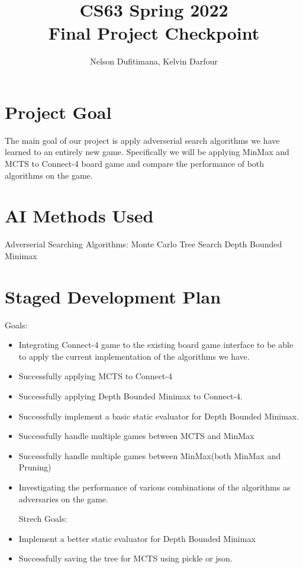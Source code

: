 \documentclass[11pt]{article}
\title{CS63 Spring 2022\\Final Project Checkpoint}
\author{Nelson Dufitimana, Kelvin Darfour}
\date{}
\begin{document}
\maketitle

\section{Project Goal}

The main goal of our project is apply adverserial search algorithms we have learned to an entirely new game. 
Specifically we will be applying MinMax and MCTS to Connect-4 board game and compare the performance of both algorithms
on the game.

\section{AI Methods Used}

Adverserial Searching Algorithms: 
Monte Carlo Tree Search
Depth Bounded Minimax

\section{Staged Development Plan}

Goals:
\begin{itemize}
\item Integrating Connect-4 game to the existing board game interface to be able 
to apply the current implementation of the algorithms we have.

\item Successfully applying MCTS to Connect-4
\item Successfully applying Depth Bounded Minimax to Connect-4.

\item Successfully implement a basic static evaluator for Depth Bounded Minimax.

\item Successfully handle multiple games between MCTS and MinMax
\item Successfully handle multiple games between MinMax(both MinMax and Pruning)

\item Investigating the performance of various combinations of the algorithms as adversaries on the game.

Strech Goals:
\item Implement a better static evaluator for Depth Bounded Minimax 
\item Successfully saving the tree for MCTS using pickle or json.
\end{itemize}
\end{document}

